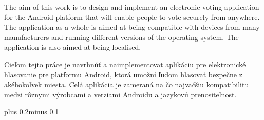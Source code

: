 \documentclass[11pt,twoside,a4paper]{book}
\begin{document}
 
\abstractpage

The aim of this work is to design and implement an electronic voting application for the Android platform that will enable people to vote securely from anywhere. The application as a whole is aimed at being compatible with devices from many manufacturers and running different versions of the operating system. The application is also aimed at being localised.




\baselineskip

\noindent
 Cieľom tejto práce je navrhnúť a naimplementovat aplikáciu pre elektronické hlasovanie pre platformu Android, ktorá umožní ľudom hlasovať bezpečne z akéhokoľvek miesta. Celá aplikácia je zameraná na čo najvačšiu kompatibilitu medzi rôznymi výrobcami a verziami Androidu a jazykovú prenositeľnost.
 


\tableofcontents



\listoffigures



\listoftables



\mainbodystarts
\normalfont
{}\baselineskip plus 0.2\baselineskip minus 0.1\baselineskip



% 
% 
\end{document}
